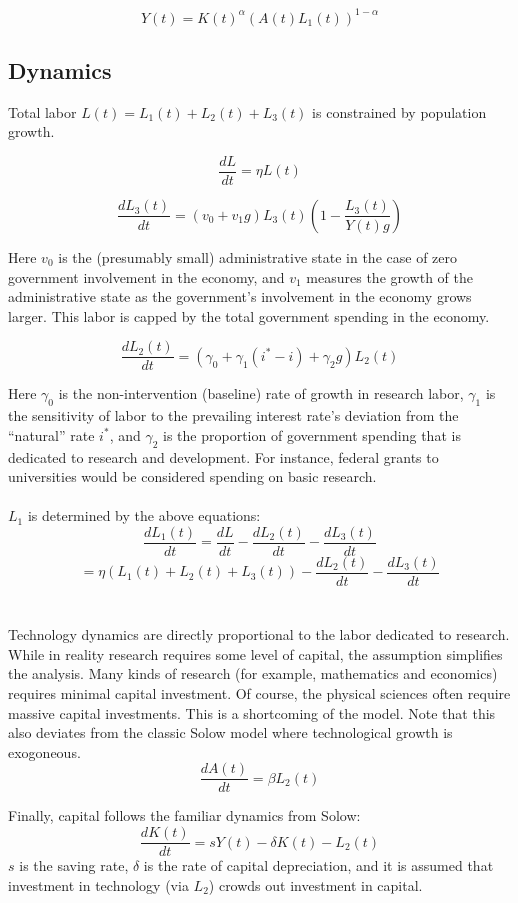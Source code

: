 \documentclass[12pt]{article}
\theoremstyle{definition}
\begin{document}
\[Y(t)=K(t)^\alpha (A(t)L_1(t))^{1-\alpha}\]

\subsection{Dynamics}

Total labor \(L(t)=L_1(t)+L_2(t)+L_3(t)\) is constrained by population growth.

\[\frac{dL}{dt}=\eta L(t)\]

\[\frac{dL_3(t)}{dt}=\left(v_0+v_1g\right)L_3(t)\left(1-\frac{L_3(t)}{Y(t)g}\right) \]

Here \(v_0\) is the (presumably small) administrative state in the case of zero government involvement in the economy, and \(v_1\) measures the growth of the administrative state as the government's involvement in the economy grows larger.  This labor is capped by the total government spending in the economy.

\[\frac{dL_2(t)}{dt}=\left(\gamma_0+\gamma_1 (i^*-i) +\gamma_2 g\right) L_2(t) \]

Here \(\gamma_0\) is the non-intervention (baseline) rate of growth in research labor, \(\gamma_1\) is the sensitivity of labor to the prevailing interest rate's deviation from the ``natural'' rate \(i^*\), and \(\gamma_2\) is the proportion of government spending that is dedicated to research and development.  For instance, federal grants to universities would be considered spending on basic research.   
\\
\\
\(L_1\) is determined by the above equations:
\[\frac{dL_1(t)}{dt}=\frac{dL}{dt}-\frac{dL_2(t)}{dt}-\frac{dL_3(t)}{dt}\] 
\[=\eta\left(L_1(t)+L_2(t)+L_3(t)\right)-\frac{dL_2(t)}{dt}-\frac{dL_3(t)}{dt}\]
\\
\\
Technology dynamics are directly proportional to the labor dedicated to research.  While in reality research requires some level of capital, the assumption simplifies the analysis.  Many kinds of research (for example, mathematics and economics) requires minimal capital investment.  Of course, the physical sciences often require massive capital investments.  This is a shortcoming of the model.  Note that this also deviates from the classic Solow model where technological growth is exogoneous.
\[\frac{dA(t)}{dt}=\beta L_2(t)\]

Finally, capital follows the familiar dynamics from Solow:
\[\frac{dK(t)}{dt}=s Y(t) - \delta K(t)- L_2(t)\]
\(s\) is the saving rate, \(\delta\) is the rate of capital depreciation, and it is assumed that investment in technology (via \(L_2\)) crowds out investment in capital.  
\end{document}

